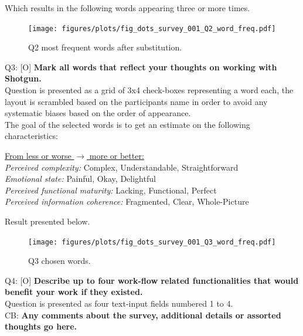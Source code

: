   Which results in the following words appearing three or more times.

  \begin{figure}[H]
    \centering
    \texttt{[image: figures/plots/fig\_dots\_survey\_001\_Q2\_word\_freq.pdf]}
    \caption{Q2 most frequent words after substitution.}
  \end{figure}

  Q3: [O] \textbf{%
    Mark all words that reflect your thoughts on working with \\Shotgun.
  } \\
  Question is presented as a grid of 3x4 check-boxes representing a word each, the
  layout is scrambled based on the participants name in order to avoid any
  systematic biases based on the order of appearance. \\

  The goal of the selected words is to get an estimate on the following
  characteristics: \\
  \begin{adjustwidth}{0.5cm}{}
    \underline{From less or worse $\longrightarrow$ more or better:} \\
    \textit{Perceived complexity:} Complex, Understandable, Straightforward \\
    \textit{Emotional state:} Painful, Okay, Delightful \\
    \textit{Perceived functional maturity:} Lacking, Functional, Perfect \\
    \textit{Perceived information coherence:} Fragmented, Clear, Whole-Picture \\
  \end{adjustwidth}

  Result presented below.

  \begin{figure}[H]
    \centering
    \hspace{-2.35cm}
    \texttt{[image: figures/plots/fig\_dots\_survey\_001\_Q3\_word\_freq.pdf]}
    \caption{Q3 chosen words.}
  \end{figure}

  Q4: [O] \textbf{%
    Describe up to four work-flow related functionalities that would benefit
    your work if they existed.
  } \\
  Question is presented as four text-input fields numbered 1 to 4.\\

  CB: \textbf{%
    Any comments about the survey, additional details or assorted thoughts
    go here.
  }\\


